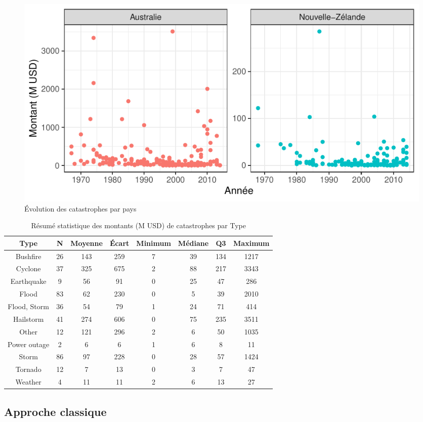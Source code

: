\begin{frame}
\begin{figure}
\includegraphics[width=.8\textwidth]{images/fig-007.pdf}
\caption{Évolution des catastrophes par pays}
\end{figure}
\end{frame}

\begin{frame}
\begin{table}[ht]
\centering
\begin{tabular}{cccccccc}
  \hline
Type & N & Moyenne & Écart & Minimum & Médiane & Q3 & Maximum \\ 
  \hline
Bushfire & 26 & 143 & 259 & 7 & 39 & 134 & 1217 \\ 
  Cyclone & 37 & 325 & 675 & 2 & 88 & 217 & 3343 \\ 
  Earthquake & 9 & 56 & 91 & 0 & 25 & 47 & 286 \\ 
  Flood & 83 & 62 & 230 & 0 & 5 & 39 & 2010 \\ 
  Flood, Storm & 36 & 54 & 79 & 1 & 24 & 71 & 414 \\ 
  Hailstorm & 41 & 274 & 606 & 0 & 75 & 235 & 3511 \\ 
  Other & 12 & 121 & 296 & 2 & 6 & 50 & 1035 \\ 
  Power outage & 2 & 6 & 6 & 1 & 6 & 8 & 11 \\ 
  Storm & 86 & 97 & 228 & 0 & 28 & 57 & 1424 \\ 
  Tornado & 12 & 7 & 13 & 0 & 3 & 7 & 47 \\ 
  Weather & 4 & 11 & 11 & 2 & 6 & 13 & 27 \\ 
   \hline
\end{tabular}
\caption{Résumé statistique des montants (M USD) de catastrophes par Type} 
\label{tab:3.6}
\end{table}\end{frame}

\subsection{Approche classique}

